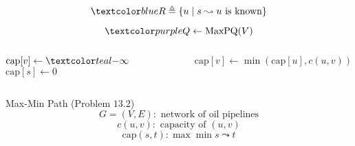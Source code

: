 \begin{frame}{}
  \[
    \blue{R \triangleq \set{u \mid s \leadsto u \text{ is known}}}
  \]

  \pause
  \[
    \purple{Q \gets \text{MaxPQ}(V)}
  \]

  \pause
  \vspace{0.50cm}
  \begin{columns}
      \begin{algorithmic}
	  \State $\text{cap}[v] \gets \teal{-\infty}$
	\EndFor
	\State $\text{cap}[s] \gets 0$
      \end{algorithmic}
      \begin{algorithmic}
	  \State $\text{cap}[v] \gets \min(\text{cap}[u], c(u,v))$
	\EndIf
      \end{algorithmic}
  \end{columns}
\end{frame}

\begin{frame}{}
  \begin{exampleblock}{Max-Min Path (Problem $13.2$)}
    \[
      G = (V, E): \text{ network of oil pipelines}
    \]
    \[
      c(u,v): \text{ capacity of } (u,v)
    \]
    \[
      \text{cap}(s,t): \max \min s \leadsto t
    \]
      
    \vspace{0.30cm}
    \centerline{}
  \end{exampleblock}

  \pause
  \vspace{0.30cm}
\end{frame}
